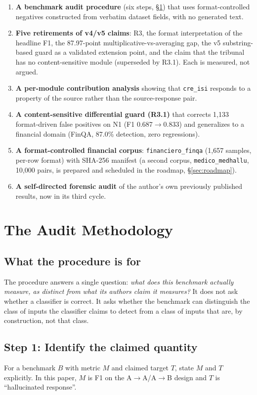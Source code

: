 \documentclass[11pt,a4paper]{article}
\begin{document}
\begin{enumerate}
    \item \textbf{A benchmark audit procedure} (six steps, \S\ref{sec:audit-methodology}) that uses format-controlled negatives constructed from verbatim dataset fields, with no generated text.
    \item \textbf{Five retirements of v4/v5 claims}: R3, the format interpretation of the headline F1, the 87.97-point multiplicative-vs-averaging gap, the v5 substring-based guard as a validated extension point, and the claim that the tribunal has no content-sensitive module (superseded by R3.1). Each is measured, not argued.
    \item \textbf{A per-module contribution analysis} showing that \texttt{cre\_isi} responds to a property of the source rather than the source-response pair.
    \item \textbf{A content-sensitive differential guard (R3.1)} that corrects 1,133 format-driven false positives on N1 (F1 0.687$\to$0.833) and generalizes to a financial domain (FinQA, 87.0\% detection, zero regressions).
    \item \textbf{A format-controlled financial corpus}: \texttt{financiero\_finqa} (1,657 samples, per-row format) with SHA-256 manifest (a second corpus, \texttt{medico\_medhallu}, 10,000 pairs, is prepared and scheduled in the roadmap, \S\ref{sec:roadmap}).
    \item \textbf{A self-directed forensic audit} of the author's own previously published results, now in its third cycle.
\end{enumerate}

\section{The Audit Methodology}
\label{sec:audit-methodology}

\subsection{What the procedure is for}

The procedure answers a single question: \emph{what does this benchmark actually measure, as distinct from what its authors claim it measures?} It does not ask whether a classifier is correct. It asks whether the benchmark can distinguish the class of inputs the classifier claims to detect from a class of inputs that are, by construction, not that class.

\subsection{Step 1: Identify the claimed quantity}
For a benchmark $B$ with metric $M$ and claimed target $T$, state $M$ and $T$ explicitly. In this paper, $M$ is F1 on the A$\rightarrow$A/A$\rightarrow$B design and $T$ is ``hallucinated response''.
\end{document}
